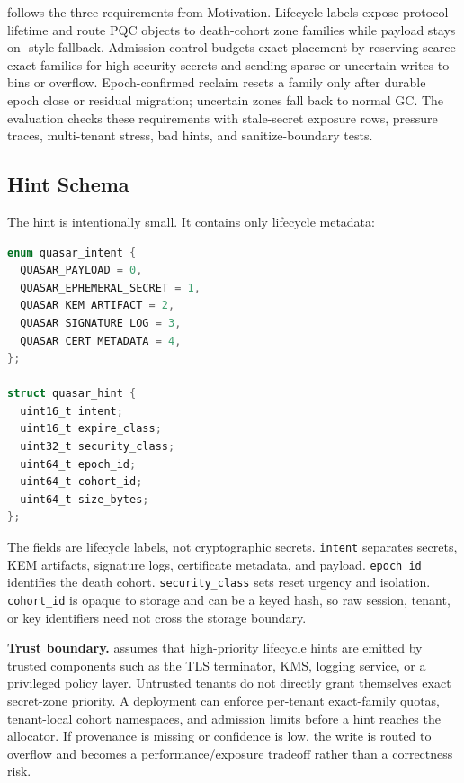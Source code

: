 \system follows the three requirements from Motivation.  Lifecycle labels expose protocol lifetime and route PQC objects to death-cohort zone families while payload stays on \dogi-style fallback.  Admission control budgets exact placement by reserving scarce exact families for high-security secrets and sending sparse or uncertain writes to bins or overflow.  Epoch-confirmed reclaim resets a family only after durable epoch close or residual migration; uncertain zones fall back to normal GC.  The evaluation checks these requirements with stale-secret exposure rows, pressure traces, multi-tenant stress, bad hints, and sanitize-boundary tests.

\subsection{Hint Schema}

The hint is intentionally small.  It contains only lifecycle metadata:

\begin{lstlisting}[language=C,caption={Minimal \system hint schema.},label={lst:hint}]
enum quasar_intent {
  QUASAR_PAYLOAD = 0,
  QUASAR_EPHEMERAL_SECRET = 1,
  QUASAR_KEM_ARTIFACT = 2,
  QUASAR_SIGNATURE_LOG = 3,
  QUASAR_CERT_METADATA = 4,
};

struct quasar_hint {
  uint16_t intent;
  uint16_t expire_class;
  uint32_t security_class;
  uint64_t epoch_id;
  uint64_t cohort_id;
  uint64_t size_bytes;
};
\end{lstlisting}

The fields are lifecycle labels, not cryptographic secrets.  \texttt{intent} separates secrets, KEM artifacts, signature logs, certificate metadata, and payload.  \texttt{epoch\_id} identifies the death cohort.  \texttt{security\_class} sets reset urgency and isolation.  \texttt{cohort\_id} is opaque to storage and can be a keyed hash, so raw session, tenant, or key identifiers need not cross the storage boundary.

\noindent\textbf{Trust boundary.}
\system assumes that high-priority lifecycle hints are emitted by trusted components such as the TLS terminator, KMS, logging service, or a privileged policy layer.  Untrusted tenants do not directly grant themselves exact secret-zone priority.  A deployment can enforce per-tenant exact-family quotas, tenant-local cohort namespaces, and admission limits before a hint reaches the allocator.  If provenance is missing or confidence is low, the write is routed to overflow and becomes a performance/exposure tradeoff rather than a correctness risk.

